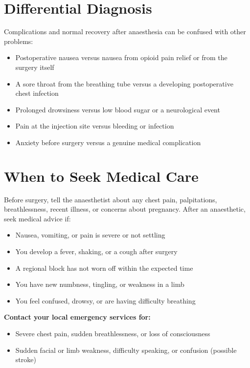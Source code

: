 \section*{Differential Diagnosis}
Complications and normal recovery after anaesthesia can be confused with other problems:
\begin{itemize}
    \item Postoperative nausea versus nausea from opioid pain relief or from the surgery itself
    \item A sore throat from the breathing tube versus a developing postoperative chest infection
    \item Prolonged drowsiness versus low blood sugar or a neurological event
    \item Pain at the injection site versus bleeding or infection
    \item Anxiety before surgery versus a genuine medical complication
\end{itemize}

\section*{When to Seek Medical Care}
Before surgery, tell the anaesthetist about any chest pain, palpitations, breathlessness, recent illness, or concerns about pregnancy. After an anaesthetic, seek medical advice if:
\begin{itemize}
    \item Nausea, vomiting, or pain is severe or not settling
    \item You develop a fever, shaking, or a cough after surgery
    \item A regional block has not worn off within the expected time
    \item You have new numbness, tingling, or weakness in a limb
    \item You feel confused, drowsy, or are having difficulty breathing
\end{itemize}

\textbf{Contact your local emergency services for:}
\begin{itemize}
    \item Severe chest pain, sudden breathlessness, or loss of consciousness
    \item Sudden facial or limb weakness, difficulty speaking, or confusion (possible stroke)
\end{itemize}

